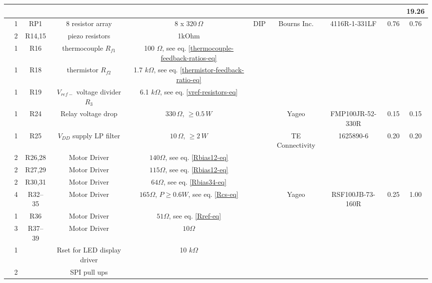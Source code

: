 \documentclass[10pt, twocolumn]{article}
\begin{document}
\begin{center}
\begin{adjustbox}{max width=\textwidth}
\begin{tabular}{c c c c c c c c c c}
\hline
&&&&&&&&&	19.26	\\
\hline

	&1	&RP1	&8 resistor array	&8 x $320\,\Omega$		&DIP
	&Bourns Inc.		&4116R-1-331LF		&0.76		&0.76		\\

	&2	&R14,15	&piezo resistors	&1kOhm				&
	&			&			&		&	\\

	&1	&R16	&thermocouple $R_{f1}$	&100 $\Omega$, see eq. \ref{thermocouple-feedback-ratios-eq}	&
	&			&			&		&		\\

	&1	&R18	&thermistor $R_{f2}$	&1.7 $k\Omega$, see eq. \ref{thermistor-feedback-ratio-eq}	&
	&			&			&		&		\\

	&1	&R19	&$V_{ref-}$ voltage divider $R_{3}$	&6.1 $k\Omega$, see eq. \ref{vref-resistors-eq}	&
	&			&			&		&		\\

	&1	&R24	&Relay voltage drop	&$330\,\Omega$, $\geq 0.5\,W$	&
	&Yageo			&FMP100JR-52-330R	&0.15		&0.15		\\

	&1	&R25	&$V_{DD}$ supply LP filter	&$10\,\Omega$, $\geq 2\,W$	&
	&TE Connectivity	&1625890-6		&0.20		&0.20		\\
	
	&2	&R26,28	&Motor Driver	&$140\Omega$, see eq. \ref{Rbias12-eq}	&
	&			&			&		&		\\

	&2	&R27,29	&Motor Driver	&$115\Omega$, see eq. \ref{Rbias12-eq}	&
	&			&			&		&		\\

	&2	&R30,31	&Motor Driver	&$64\Omega$, see eq. \ref{Rbias34-eq}	&
	&			&			&		&		\\

	&4	&R32--35	&Motor Driver	&$165\Omega$, $P\geq 0.6W$, see eq. \ref{Rcs-eq}	&
	&Yageo			&RSF100JB-73-160R	&0.25		&1.00		\\

	&1	&R36	&Motor Driver		&$51\Omega$, see eq. \ref{Rref-eq}
	&			&			&		&		\\

	&3	&R37--39	&Motor Driver	&$10\Omega$		&
	&			&			&		&		\\

	&1	&	&Rset for LED display driver	&10 $k\Omega$		&
	&			&			&		&	\\

	&2	&	&SPI pull ups			&			&
	&			&			&		&	\\


\end{tabular}
\end{adjustbox}
\end{center}
\end{document}

